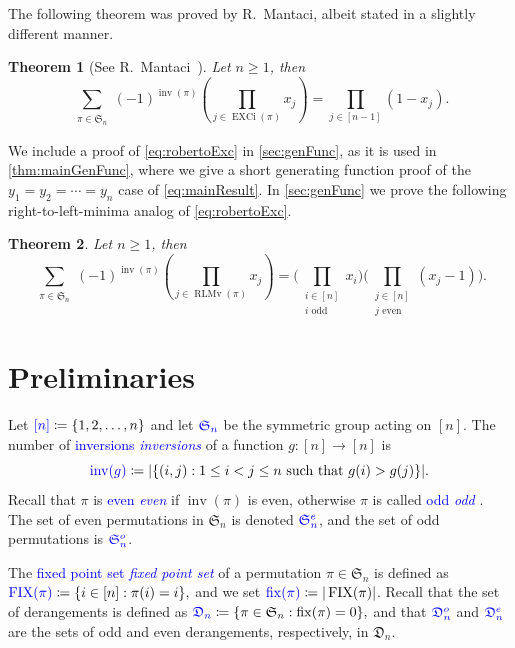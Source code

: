 \documentclass[reqno]{amsart}
\newtheorem{theorem}{Theorem}
\theoremstyle{definition}
\newcommand{\defin}[1]{%
\relax\ifmmode%
\textcolor{blue}{#1}%
\else\textcolor{blue}{\emph{#1}}%
\fi%
}
\newcommand{\symS}{\mathfrak{S}}
\newcommand{\dArr}{\mathfrak{D}}
\DeclareMathOperator{\inv}{inv}
\DeclareMathOperator{\fix}{fix}
\DeclareMathOperator{\FIX}{FIX}
\DeclareMathOperator{\EXCi}{EXCi}
\DeclareMathOperator{\RLMv}{RLMv}
\begin{document}
The following theorem was proved by R.~Mantaci, albeit stated in a slightly different manner.
\begin{theorem}[{See  R.~Mantaci~\cite{Mantaci1993}}]
Let $n \geq 1$, then
\begin{equation}\label{eq:robertoExc}
\sum_{\substack{\pi \in \symS_n}} (-1)^{\inv(\pi)} 
 \left(\prod_{j \in \EXCi(\pi)} x_j \right)
= \prod_{j \in [n-1]} (1-x_j).
\end{equation}
\end{theorem}
We include a proof of \eqref{eq:robertoExc}
in \cref{sec:genFunc}, as it is used in \cref{thm:mainGenFunc},
where we give a short generating function proof of the $y_1=y_2=\dotsb = y_n$
case of \eqref{eq:mainResult}.
%
In \cref{sec:genFunc} we prove the following
right-to-left-minima analog of \eqref{eq:robertoExc}.
\begin{theorem}
Let $n \geq 1$, then
\begin{equation}\label{eq:rlminSumIntro}
 \sum_{\substack{\pi \in \symS_n   }} (-1)^{\inv(\pi)} 
 \left(\prod_{j \in \RLMv(\pi)} x_j \right)
 = 
	\big(\prod_{\substack{i \in [n] \\ i \text{ odd}}} x_i\big)
	\big(\prod_{\substack{j \in [n] \\ j \text{ even}}} (x_j-1)\big).
\end{equation}
\end{theorem}



\section{Preliminaries}\label{sec:prelim}


Let $\defin{[n]} \coloneqq \{1,2,\dotsc,n\}$ and let $\defin{\symS_n}$
be the symmetric group acting on $[n]$.
The number of \defin{inversions} of a function $g:[n]\to [n]$ is
\begin{equation}\label{eq:invDef}
\defin{\inv(g)} \coloneqq |\{ (i,j) : 1\leq i < j \leq n \text{ such that } g(i)>g(j) \}|.
\end{equation}
%
Recall that $\pi$ is \defin{even} if $\inv(\pi)$ is even, otherwise $\pi$ is called \defin{odd}. 
The set of even permutations in $\symS_n$ is denoted $\defin{\symS^e_n}$,
and the set of odd permutations is $\defin{\symS^o_n}$.

\medskip 

The \defin{fixed point set} of a permutation $\pi \in \symS_n$ is defined as
$
  \defin{\FIX(\pi)} \coloneqq \{ i \in [n] : \pi(i) = i \},
$
and we set $\defin{\fix(\pi)} \coloneqq |\FIX(\pi)|$.
Recall that the set of derangements is defined as
$
 \defin{\dArr_n} \coloneqq \{ \pi \in \symS_n : \fix(\pi) = 0 \},
$
and that $\defin{\dArr^o_n}$ and $\defin{\dArr^e_n}$
are the sets of odd and even derangements, respectively, in $\dArr_n$.
\end{document}
